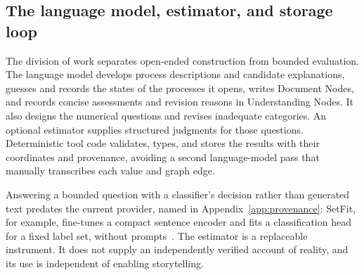 \documentclass[11pt,a4paper]{article}
\begin{document}
\subsection{The language model, estimator, and storage loop}

The division of work separates open-ended construction from bounded evaluation.
The language model develops process descriptions and candidate explanations,
guesses and records the states of the processes it opens, writes Document Nodes,
and records concise assessments and revision reasons in Understanding Nodes. It also designs the numerical
questions and revises inadequate categories. An optional estimator supplies
structured judgments for those questions. Deterministic tool code validates,
types, and stores the results with their coordinates and provenance, avoiding a
second language-model pass that manually transcribes each value and graph edge.

Answering a bounded question with a classifier's decision rather than generated
text predates the current provider, named in Appendix~\ref{app:provenance}:
SetFit, for example, fine-tunes a compact sentence encoder and fits a
classification head for a fixed label set, without
prompts~\cite{tunstall2022setfit}. The estimator is a replaceable instrument. It
does not supply an independently verified account of reality, and its use is
independent of enabling storytelling.
\end{document}

